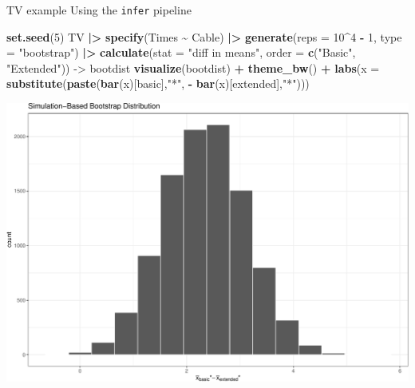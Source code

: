 \documentclass[
  ignorenonframetext,
]{beamer}
\newenvironment{Shaded}{\begin{snugshade}}{\end{snugshade}}
\newcommand{\AttributeTok}[1]{\textcolor[rgb]{0.13,0.29,0.53}{#1}}
\newcommand{\DecValTok}[1]{\textcolor[rgb]{0.00,0.00,0.81}{#1}}
\newcommand{\FunctionTok}[1]{\textcolor[rgb]{0.13,0.29,0.53}{\textbf{#1}}}
\newcommand{\NormalTok}[1]{#1}
\newcommand{\OtherTok}[1]{\textcolor[rgb]{0.56,0.35,0.01}{#1}}
\newcommand{\SpecialCharTok}[1]{\textcolor[rgb]{0.81,0.36,0.00}{\textbf{#1}}}
\newcommand{\StringTok}[1]{\textcolor[rgb]{0.31,0.60,0.02}{#1}}
\begin{document}
\begin{frame}[fragile]{TV example}
\protect\hypertarget{tv-example-6}{}
Using the \texttt{infer} pipeline

\tiny

\begin{Shaded}
\begin{Highlighting}[]
\FunctionTok{set.seed}\NormalTok{(}\DecValTok{5}\NormalTok{)}
\NormalTok{TV }\SpecialCharTok{|\textgreater{}} 
  \FunctionTok{specify}\NormalTok{(Times }\SpecialCharTok{\textasciitilde{}}\NormalTok{ Cable) }\SpecialCharTok{|\textgreater{}} 
  \FunctionTok{generate}\NormalTok{(}\AttributeTok{reps =} \DecValTok{10}\SpecialCharTok{\^{}}\DecValTok{4} \SpecialCharTok{{-}} \DecValTok{1}\NormalTok{, }\AttributeTok{type =} \StringTok{"bootstrap"}\NormalTok{) }\SpecialCharTok{|\textgreater{}} 
  \FunctionTok{calculate}\NormalTok{(}\AttributeTok{stat =} \StringTok{"diff in means"}\NormalTok{, }\AttributeTok{order =} \FunctionTok{c}\NormalTok{(}\StringTok{"Basic"}\NormalTok{, }\StringTok{"Extended"}\NormalTok{)) }\OtherTok{{-}\textgreater{}}\NormalTok{ bootdist}
\FunctionTok{visualize}\NormalTok{(bootdist) }\SpecialCharTok{+} \FunctionTok{theme\_bw}\NormalTok{() }\SpecialCharTok{+}
  \FunctionTok{labs}\NormalTok{(}\AttributeTok{x =} \FunctionTok{substitute}\NormalTok{(}\FunctionTok{paste}\NormalTok{(}\FunctionTok{bar}\NormalTok{(x)[basic],}\StringTok{"*"}\NormalTok{, }\SpecialCharTok{{-}} \FunctionTok{bar}\NormalTok{(x)[extended],}\StringTok{"*"}\NormalTok{)))}
\end{Highlighting}
\end{Shaded}

\begin{center}\includegraphics[width=0.7\linewidth,height=0.45\textheight]{Week10_Lect_files/figure-beamer/unnamed-chunk-32-1} \end{center}
\normalsize
\end{frame}
\end{document}

